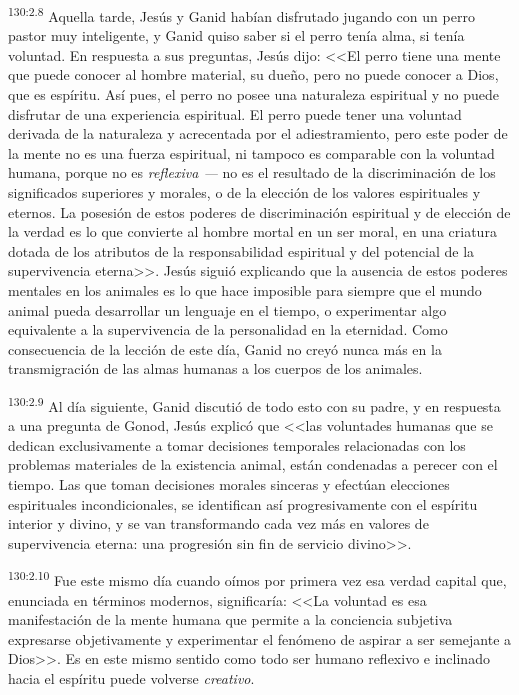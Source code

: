 \par 
\textsuperscript{130:2.8} Aquella tarde, Jesús y Ganid habían disfrutado jugando con un perro pastor muy inteligente, y Ganid quiso saber si el perro tenía alma, si tenía voluntad. En respuesta a sus preguntas, Jesús dijo: <<El perro tiene una mente que puede conocer al hombre material, su dueño, pero no puede conocer a Dios, que es espíritu. Así pues, el perro no posee una naturaleza espiritual y no puede disfrutar de una experiencia espiritual. El perro puede tener una voluntad derivada de la naturaleza y acrecentada por el adiestramiento, pero este poder de la mente no es una fuerza espiritual, ni tampoco es comparable con la voluntad humana, porque no es \textit{reflexiva ---} no es el resultado de la discriminación de los significados superiores y morales, o de la elección de los valores espirituales y eternos. La posesión de estos poderes de discriminación espiritual y de elección de la verdad es lo que convierte al hombre mortal en un ser moral, en una criatura dotada de los atributos de la responsabilidad espiritual y del potencial de la supervivencia eterna>>. Jesús siguió explicando que la ausencia de estos poderes mentales en los animales es lo que hace imposible para siempre que el mundo animal pueda desarrollar un lenguaje en el tiempo, o experimentar algo equivalente a la supervivencia de la personalidad en la eternidad. Como consecuencia de la lección de este día, Ganid no creyó nunca más en la transmigración de las almas humanas a los cuerpos de los animales.

\par 
\textsuperscript{130:2.9} Al día siguiente, Ganid discutió de todo esto con su padre, y en respuesta a una pregunta de Gonod, Jesús explicó que <<las voluntades humanas que se dedican exclusivamente a tomar decisiones temporales relacionadas con los problemas materiales de la existencia animal, están condenadas a perecer con el tiempo. Las que toman decisiones morales sinceras y efectúan elecciones espirituales incondicionales, se identifican así progresivamente con el espíritu interior y divino, y se van transformando cada vez más en valores de supervivencia eterna: una progresión sin fin de servicio divino>>.

\par 
\textsuperscript{130:2.10} Fue este mismo día cuando oímos por primera vez esa verdad capital que, enunciada en términos modernos, significaría: <<La voluntad es esa manifestación de la mente humana que permite a la conciencia subjetiva expresarse objetivamente y experimentar el fenómeno de aspirar a ser semejante a Dios>>. Es en este mismo sentido como todo ser humano reflexivo e inclinado hacia el espíritu puede volverse \textit{creativo}.

